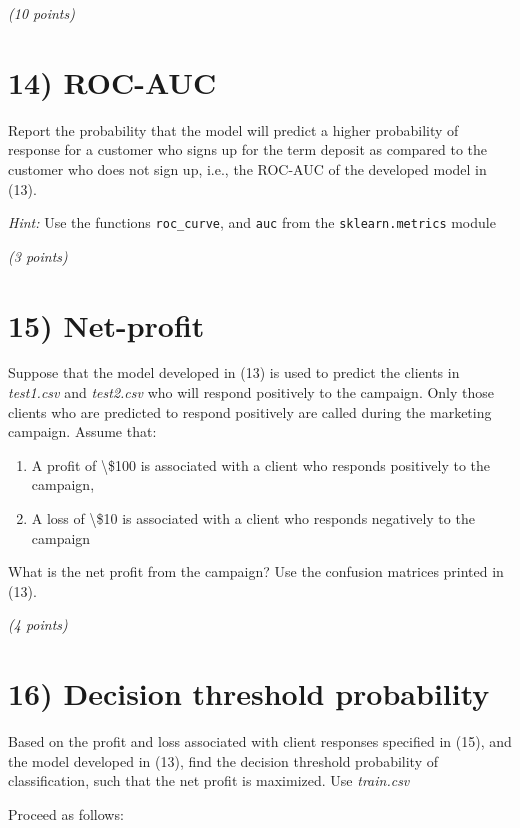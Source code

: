 \documentclass[
  letterpaper,
  DIV=11,
  numbers=noendperiod]{scrreprt}
\begin{document}
\emph{(10 points)}

\section{14) ROC-AUC}\label{roc-auc}

Report the probability that the model will predict a higher probability
of response for a customer who signs up for the term deposit as compared
to the customer who does not sign up, i.e., the ROC-AUC of the developed
model in (13).

\emph{Hint:} Use the functions \texttt{roc\_curve}, and \texttt{auc}
from the \texttt{sklearn.metrics} module

\emph{(3 points)}

\section{15) Net-profit}\label{net-profit}

Suppose that the model developed in (13) is used to predict the clients
in \emph{test1.csv} and \emph{test2.csv} who will respond positively to
the campaign. Only those clients who are predicted to respond positively
are called during the marketing campaign. Assume that:

\begin{enumerate}
\def\labelenumi{\arabic{enumi}.}
\item
  A profit of \textbackslash\$100 is associated with a client who
  responds positively to the campaign,
\item
  A loss of \textbackslash\$10 is associated with a client who responds
  negatively to the campaign
\end{enumerate}

What is the net profit from the campaign? Use the confusion matrices
printed in (13).

\emph{(4 points)}

\section{16) Decision threshold
probability}\label{decision-threshold-probability}

Based on the profit and loss associated with client responses specified
in (15), and the model developed in (13), find the decision threshold
probability of classification, such that the net profit is maximized.
Use \emph{train.csv}

Proceed as follows:
\end{document}
